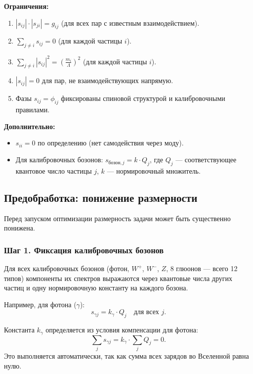 \documentclass[12pt,a4paper]{article}
\begin{document}
\textbf{Ограничения:}
\begin{enumerate}[label=(\arabic*)]
    \item $|s_{ij}| \cdot |s_{ji}| = g_{ij}$ \quad (для всех пар с известным взаимодействием).
    \item $\sum_{j \neq i} s_{ij} = 0$ \quad (для каждой частицы $i$).
    \item $\sum_{j \neq i} |s_{ij}|^2 = \left( \frac{m_i}{\Lambda} \right)^2$ \quad (для каждой частицы $i$).
    \item $|s_{ij}| = 0$ для пар, не взаимодействующих напрямую.
    \item Фазы $s_{ij} = \phi_{ij}$ фиксированы спиновой структурой и калибровочными правилами.
\end{enumerate}

\textbf{Дополнительно:}
\begin{itemize}
    \item $s_{ii} = 0$ по определению (нет самодействия через моду).
    \item Для калибровочных бозонов: $s_{\text{бозон}, j} = k \cdot Q_j$, где $Q_j$ --- соответствующее квантовое число частицы $j$, $k$ --- нормировочный множитель.
\end{itemize}

\subsection{Предобработка: понижение размерности}
Перед запуском оптимизации размерность задачи может быть существенно понижена.

\subsubsection{Шаг 1. Фиксация калибровочных бозонов}
Для всех калибровочных бозонов (фотон, $W^+$, $W^-$, $Z$, 8 глюонов --- всего 12 типов) компоненты их спектров выражаются через квантовые числа других частиц и одну нормировочную константу на каждого бозона.

Например, для фотона ($\gamma$):
\begin{equation}
    s_{\gamma j} = k_\gamma \cdot Q_j \quad \text{для всех } j.
\end{equation}

Константа $k_\gamma$ определяется из условия компенсации для фотона:
\begin{equation}
    \sum_j s_{\gamma j} = k_\gamma \cdot \sum_j Q_j = 0.
\end{equation}
Это выполняется автоматически, так как сумма всех зарядов во Вселенной равна нулю.
\end{document}
